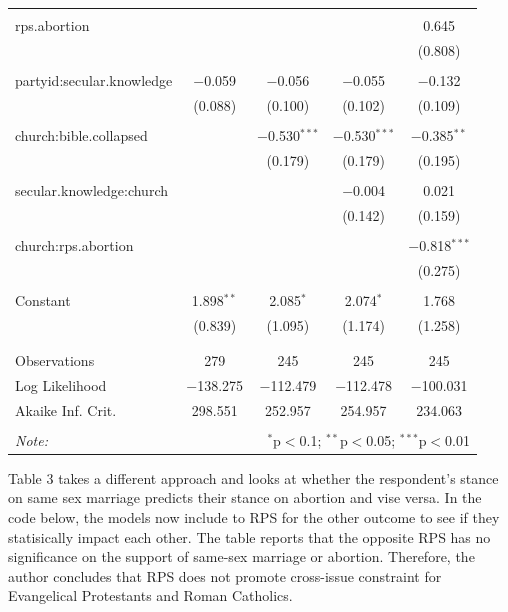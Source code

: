 \documentclass[12pt,letterpaper]{article}
\begin{document}
\begin{description}
\begin{table}[H]
\begin{tabular}{@{\extracolsep{5pt}}lcccc}
		& & & & \\ 
		rps.abortion &  &  &  & 0.645 \\ 
		&  &  &  & (0.808) \\ 
		& & & & \\ 
		partyid:secular.knowledge & $-$0.059 & $-$0.056 & $-$0.055 & $-$0.132 \\ 
		& (0.088) & (0.100) & (0.102) & (0.109) \\ 
		& & & & \\ 
		church:bible.collapsed &  & $-$0.530$^{***}$ & $-$0.530$^{***}$ & $-$0.385$^{**}$ \\ 
		&  & (0.179) & (0.179) & (0.195) \\ 
		& & & & \\ 
		secular.knowledge:church &  &  & $-$0.004 & 0.021 \\ 
		&  &  & (0.142) & (0.159) \\ 
		& & & & \\ 
		church:rps.abortion &  &  &  & $-$0.818$^{***}$ \\ 
		&  &  &  & (0.275) \\ 
		& & & & \\ 
		Constant & 1.898$^{**}$ & 2.085$^{*}$ & 2.074$^{*}$ & 1.768 \\ 
		& (0.839) & (1.095) & (1.174) & (1.258) \\ 
		& & & & \\ 
		\hline \\[-1.8ex] 
		Observations & 279 & 245 & 245 & 245 \\ 
		Log Likelihood & $-$138.275 & $-$112.479 & $-$112.478 & $-$100.031 \\ 
		Akaike Inf. Crit. & 298.551 & 252.957 & 254.957 & 234.063 \\ 
		\hline 
		\hline \\[-1.8ex] 
		\textit{Note:}  & \multicolumn{4}{r}{$^{*}$p$<$0.1; $^{**}$p$<$0.05; $^{***}$p$<$0.01} \\ 
	\end{tabular} 
\end{table}
\newpage
\item Table 3 takes a different approach and looks at whether the respondent's stance on same sex marriage predicts their stance on abortion and vise versa. In the code below, the models now include to RPS for the other outcome to see if they statisically impact each other. The table reports that the opposite RPS has no significance on the support of same-sex marriage or abortion. Therefore, the author concludes that RPS does not promote cross-issue constraint for Evangelical Protestants and Roman Catholics. 

\end{description}
\end{document}
